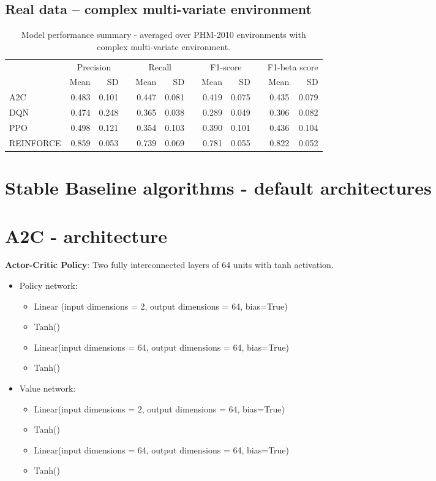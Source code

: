\documentclass[]{article}
\newcommand{\rowspace}[1]{\renewcommand{\arraystretch}{#1}}
\begin{document}
\subsection{Real data -- complex multi-variate environment}
\begin{table*}[hbt!]\centering
	\sffamily
	\rowspace{1.3}
	\begin{tabular}{@{}l rr c rr c rr c rr@{}}
		\arrayrulecolor{black!40}\toprule
		& \multicolumn{2}{c}{Precision} & \phantom{i} & \multicolumn{2}{c}{Recall} & \phantom{i} & \multicolumn{2}{c}{F1-score} & \phantom{i} & \multicolumn{2}{c}{F1-beta score} \\
		\cmidrule{2-3} \cmidrule{5-6} \cmidrule{8-9} \cmidrule{11-12} 
		
		&Mean &SD & &Mean &SD & &Mean &SD& &Mean & SD\\ \midrule
		A2C & 0.483 & 0.101 & &0.447 & 0.081 & & 0.419 & 0.075 & &0.435 &0.079 \\
		DQN & 0.474 & 0.248 & &0.365 & 0.038 & & 0.289 & 0.049 & &0.306 &0.082 \\
		PPO & 0.498 & 0.121 & &0.354 & 0.103 & & 0.390 & 0.101 & &0.436 &0.104 \\
		REINFORCE & 0.859 & 0.053 & &0.739 & 0.069 & & 0.781 & 0.055 & &0.822 &0.052 \\
		\bottomrule
	\end{tabular}
	\caption{Model performance summary - averaged over PHM-2010 environments with complex multi-variate environment.}
	\label{tbl:PHMMS}
\end{table*}


\section{Stable Baseline algorithms - default architectures}

\section{A2C - architecture}
\textbf{Actor-Critic Policy}: Two fully interconnected layers of 64 units with tanh activation.
\begin{itemize}
	\item Policy network:
	\begin{itemize}
		\item Linear (input dimensions = 2, output dimensions = 64, bias=True)
		\item Tanh()
		\item Linear(input dimensions = 64, output dimensions = 64, bias=True)
		\item Tanh()
	\end{itemize}

	\item Value network:
	\begin{itemize}
		\item Linear(input dimensions = 2, output dimensions = 64, bias=True)
		\item Tanh()
		\item Linear(input dimensions = 64, output dimensions = 64, bias=True)
		\item Tanh()
	\end{itemize}
\end{itemize}
\end{document}
